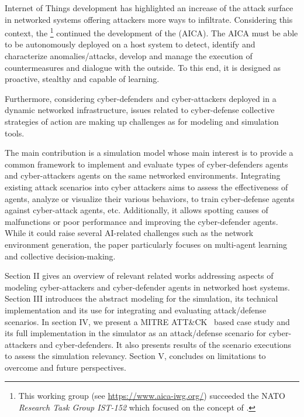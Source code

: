 
\noindent
Internet of Things development has highlighted an increase of the attack surface in networked systems offering attackers more ways to infiltrate.
Considering this context, the \footnote{This working group (see \url{https://www.aica-iwg.org/}) succeeded the NATO \textit{Research Task Group IST-152} which focused on the concept of .} continued the development of the  (AICA).
The AICA must be able to be autonomously deployed on a host system to detect, identify and characterize anomalies/attacks, develop and manage the execution of countermeasures and dialogue with the outside. To this end, it is designed as proactive, stealthy and capable of learning.

Furthermore, considering cyber-defenders and cyber-attackers deployed in a dynamic networked infrastructure, issues related to cyber-defense collective strategies of action are making up challenges as for modeling and simulation tools.

\noindent
The main contribution is a simulation model whose main interest is to provide a common framework to implement and evaluate types of cyber-defenders agents and cyber-attackers agents on the same networked environments. Integrating existing attack scenarios into cyber attackers aims to assess the effectiveness of agents, analyze or visualize their various behaviors, to train cyber-defense agents against cyber-attack agents, etc. Additionally, it allows spotting causes of malfunctions or poor performance and improving the cyber-defender agents. While it could raise several AI-related challenges such as the network environment generation, the paper particularly focuses on multi-agent learning and collective decision-making.

Section II gives an overview of relevant related works addressing aspects of modeling cyber-attackers and cyber-defender agents in networked host systems. Section III introduces the abstract modeling for the simulation, its technical implementation and its use for integrating and evaluating attack/defense scenarios. In section IV, we present a MITRE ATT\&CK~\cite{MITREATTACKWebiste} based case study and its full implementation in the simulator as an attack/defense scenario for cyber-attackers and cyber-defenders. It also presents results of the scenario executions to assess the simulation relevancy. Section V, concludes on limitations to overcome and future perspectives.

